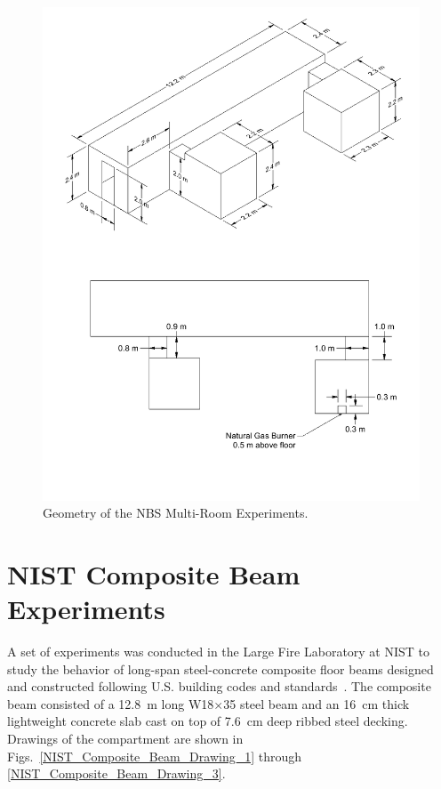 \begin{figure}[p]
\includegraphics[width=\textwidth]{FIGURES/NBS/NBS}
\caption[Geometry of the NBS Multi-Room Experiments]{Geometry of the NBS Multi-Room Experiments.}
\label{NBS_Drawing}
\end{figure}


\section{NIST Composite Beam Experiments}
\label{NIST_Composite_Beam_Description}

A set of experiments was conducted in the Large Fire Laboratory at NIST to study the behavior of long-span steel-concrete composite floor beams designed and constructed following U.S. building codes and standards~\cite{Ramesh:TN2054}. The composite beam consisted of a 12.8~m long W18$\times$35 steel beam and an 16~cm thick lightweight concrete slab cast on top of 7.6~cm deep ribbed steel decking. Drawings of the compartment are shown in Figs.~\ref{NIST_Composite_Beam_Drawing_1} through \ref{NIST_Composite_Beam_Drawing_3}.

